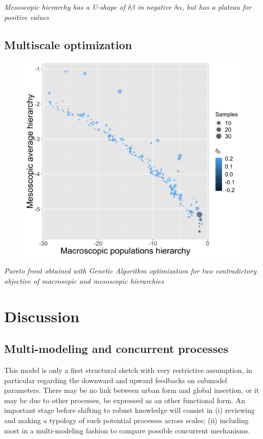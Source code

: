 \documentclass[11pt]{article}
\begin{document}
\textit{Mesoscopic hierarchy has a U-shape of $\delta \beta$ in negative $\delta \alpha$, but has a plateau for positive values} 


\subsection{Multiscale optimization}

\begin{figure}
	\includegraphics[width=0.8\textheight]{figures/pareto_macroHierarchy-mesoHierarchy.png}
\end{figure}

\textit{Pareto front obtained with Genetic Algorithm optimization for two contradictory objective of macrosopic and mesoscopic hierarchies}



\section{Discussion}


\subsection{Multi-modeling and concurrent processes}

This model is only a first structural sketch with very restrictive assumption, in particular regarding the downward and upward feedbacks on submodel parameters. There may be no link between urban form and global insertion, or it may be due to other processes, be expressed as an other functional form. An important stage before shifting to robust knowledge will consist in (i) reviewing and making a typology of such potential processes across scales; (ii) including most in a multi-modeling fashion to compare possible concurrent mechanisms.
\end{document}
